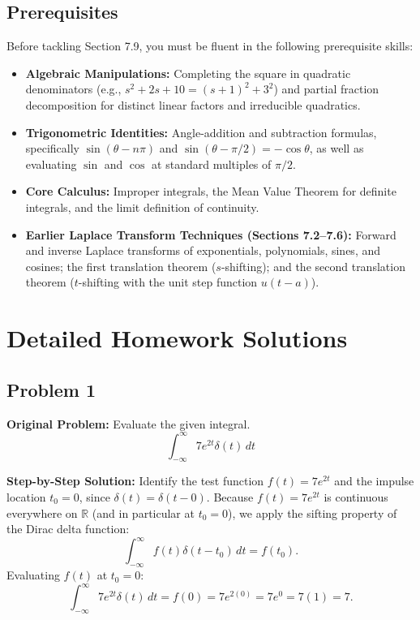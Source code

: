 \documentclass[11pt, letterpaper]{article}
\theoremstyle{definition}
\theoremstyle{remark}
\newcommand{\R}{\mathbb{R}}
\begin{document}
\subsection{Prerequisites}
Before tackling Section 7.9, you must be fluent in the following prerequisite skills:
\begin{itemize}
    \item \textbf{Algebraic Manipulations:} Completing the square in quadratic denominators (e.g., $s^2 + 2s + 10 = (s+1)^2 + 3^2$) and partial fraction decomposition for distinct linear factors and irreducible quadratics.
    \item \textbf{Trigonometric Identities:} Angle-addition and subtraction formulas, specifically $\sin(\theta - n\pi)$ and $\sin(\theta - \pi/2) = -\cos\theta$, as well as evaluating $\sin$ and $\cos$ at standard multiples of $\pi/2$.
    \item \textbf{Core Calculus:} Improper integrals, the Mean Value Theorem for definite integrals, and the limit definition of continuity.
    \item \textbf{Earlier Laplace Transform Techniques (Sections 7.2--7.6):} Forward and inverse Laplace transforms of exponentials, polynomials, sines, and cosines; the first translation theorem ($s$-shifting); and the second translation theorem ($t$-shifting with the unit step function $u(t - a)$).
\end{itemize}

\newpage

\section{Detailed Homework Solutions}

\subsection{Problem 1}
\textbf{Original Problem:}
Evaluate the given integral.
\[
    \int_{-\infty}^{\infty} 7e^{2t}\delta(t)\,dt
\]

\textbf{Step-by-Step Solution:}
Identify the test function $f(t) = 7e^{2t}$ and the impulse location $t_0 = 0$, since $\delta(t) = \delta(t - 0)$. Because $f(t) = 7e^{2t}$ is continuous everywhere on $\R$ (and in particular at $t_0 = 0$), we apply the sifting property of the Dirac delta function:
\[
    \int_{-\infty}^{\infty} f(t)\delta(t - t_0)\,dt = f(t_0).
\]
Evaluating $f(t)$ at $t_0 = 0$:
\[
    \int_{-\infty}^{\infty} 7e^{2t}\delta(t)\,dt = f(0) = 7e^{2(0)} = 7e^0 = 7(1) = 7.
\]
\end{document}
